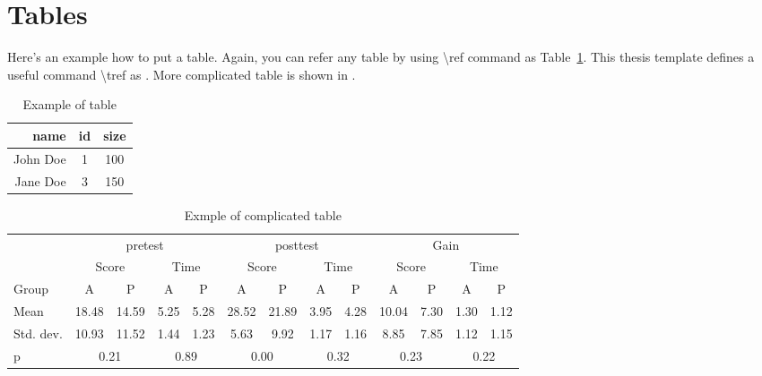 \section{Tables}
Here's an example how to put a table.
Again, you can refer any table by using \textbackslash{}ref command as Table~\ref{tab:example}.
This thesis template defines a useful command \textbackslash{}tref as .
More complicated table is shown in .
\begin{table}[tb]
	\centering
		\caption{Example of table}
		\begin{tabular}{r|c|c}
			\hline
			name & id & size \\
			\hline \hline
			John Doe & 1 & 100 \\
			Jane Doe & 3 & 150 \\
			\hline
		\end{tabular}
	\label{tab:example}
\end{table}
\begin{table}[tb]
\begin{center}
\caption{Exmple of complicated table}
\begin{tabular}{l|cc|cc||cc|cc||cc|cc}
\hline\hline
& \multicolumn{4}{c||}{pretest} & \multicolumn{4}{c||}{posttest} & \multicolumn{4}{c}{Gain} \\
\cline{2-13}
& \multicolumn{2}{c|}{Score} & \multicolumn{2}{c||}{Time} & \multicolumn{2}{c|}{Score} & \multicolumn{2}{c||}{Time} & \multicolumn{2}{c|}{Score} & \multicolumn{2}{c}{Time} \\
\hline
Group     & A     & P     & A    & P  & A     & P     & A    & P  & A     & P     & A    & P \\
\hline
Mean      & 18.48 & 14.59 & 5.25 & 5.28 & 28.52 & 21.89 & 3.95 & 4.28 & 10.04 & 7.30 & 1.30 & 1.12 \\
Std. dev. & 10.93 & 11.52 & 1.44 & 1.23 &  5.63 &  9.92 & 1.17 & 1.16 &  8.85 & 7.85 & 1.12 & 1.15 \\
\hline
p & \multicolumn{2}{c|}{0.21} & \multicolumn{2}{c||}{0.89} & \multicolumn{2}{c|}{0.00} & \multicolumn{2}{c||}{0.32} & \multicolumn{2}{c|}{0.23} & \multicolumn{2}{c}{0.22} \\
\hline\hline
\end{tabular}
\label{tab:example2}
\end{center}
\end{table}

